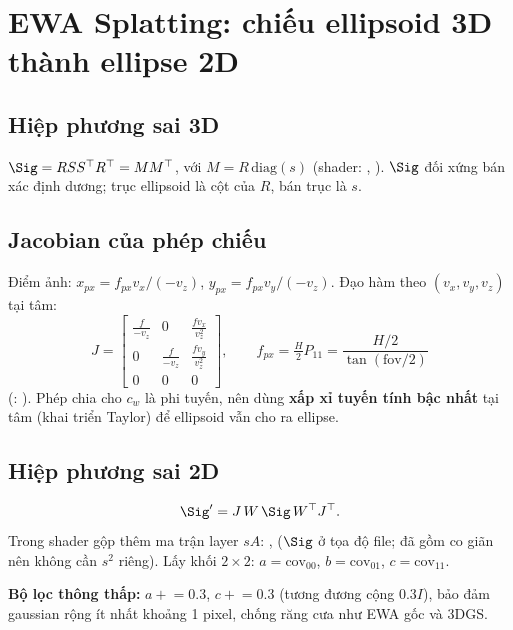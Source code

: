 \section{EWA Splatting: chiếu ellipsoid 3D thành ellipse 2D}\label{s:ewa}

\subsection{Hiệp phương sai 3D}
$\Sig = R S S^{\top} R^{\top} = M M^{\top}$, với $M=R\,\mathrm{diag}(s)$ (shader: , ). $\Sig$ đối xứng bán xác định dương; trục ellipsoid là cột của $R$, bán trục là $s$.

\subsection{Jacobian của phép chiếu}
Điểm ảnh: $x_{px}=f_{px}v_x/(-v_z)$, $y_{px}=f_{px}v_y/(-v_z)$. Đạo hàm theo $(v_x,v_y,v_z)$ tại tâm:
\[
J=\begin{bmatrix}\frac{f}{-v_z}&0&\frac{f v_x}{v_z^2}\\0&\frac{f}{-v_z}&\frac{f v_y}{v_z^2}\\0&0&0\end{bmatrix},\qquad
f_{px}=\tfrac H2 P_{11}=\frac{H/2}{\tan(\mathrm{fov}/2)}
\]
(: ). Phép chia cho $c_w$ là phi tuyến, nên dùng \textbf{xấp xỉ tuyến tính bậc nhất} tại tâm (khai triển Taylor) để ellipsoid vẫn cho ra ellipse.

\subsection{Hiệp phương sai 2D}
\[
\Sig' = J\,W\,\Sig\,W^{\top}J^{\top}.
\]
Trong shader gộp thêm ma trận layer $sA$: ,  ($\Sig$ ở tọa độ file;  đã gồm co giãn nên không cần $s^2$ riêng). Lấy khối $2\times2$: $a=\mathrm{cov}_{00}$, $b=\mathrm{cov}_{01}$, $c=\mathrm{cov}_{11}$.

\textbf{Bộ lọc thông thấp:} $a\mathrel{+}=0.3$, $c\mathrel{+}=0.3$ (tương đương cộng $0.3I$), bảo đảm gaussian rộng ít nhất khoảng 1 pixel, chống răng cưa như EWA gốc và 3DGS.

